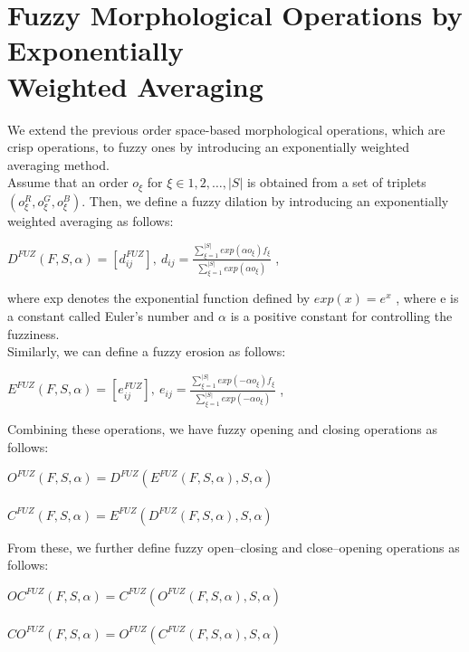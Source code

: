 \section*{Fuzzy Morphological Operations by Exponentially\\ Weighted Averaging}

We extend the previous order space-based morphological operations, which are crisp operations, to fuzzy ones by introducing an exponentially weighted averaging method.\\

Assume that an order $o_{\xi}$
 for $\xi\in{1,2,\ldots,|S|}$
 is obtained from a set of triplets $(o_{\xi}^{R}, o_{\xi}^{G}, o_{\xi}^{B})$. Then, we define a fuzzy dilation by introducing an exponentially weighted averaging  as follows:\\
\begin{center}
 $D^{FUZ}(F,S,\alpha) = [d_{ij}^{FUZ}], \  d_{ij}=\frac{\displaystyle\sum_{\xi=1}^{|S|} exp (\alpha o_{\xi})f_{\xi}}{\displaystyle\sum_{\xi=1}^{|S|} exp (\alpha o_{\xi})}$ , \\
 \end{center}
 
 where exp denotes the exponential function defined by $exp(x)=e^{x}$
, where e is a constant called Euler’s number and $\alpha$
 is a positive constant for controlling the fuzziness.\\

 Similarly, we can define a fuzzy erosion as follows:
 \begin{center}
 $E^{FUZ}(F,S,\alpha) = [e_{ij}^{FUZ}], \  e_{ij}=\frac{\displaystyle\sum_{\xi=1}^{|S|} exp (-\alpha o_{\xi})f_{\xi}}{\displaystyle\sum_{\xi=1}^{|S|} exp (-\alpha o_{\xi})}$ , \\
 \end{center}
Combining these operations, we have fuzzy opening and closing operations as follows:
\begin{center}
$O^{FUZ}(F,S,\alpha)=D^{FUZ}(E^{FUZ}(F,S,\alpha),S,\alpha)$
\\
\ 
\\
$C^{FUZ}(F,S,\alpha)=E^{FUZ}(D^{FUZ}(F,S,\alpha),S,\alpha)$
\end{center}
From these, we further define fuzzy open–closing and close–opening operations as follows:
\begin{center}
$OC^{FUZ}(F,S,\alpha)=C^{FUZ}(O^{FUZ}(F,S,\alpha),S,\alpha)$
\\
\ 
\\
$CO^{FUZ}(F,S,\alpha)=O^{FUZ}(C^{FUZ}(F,S,\alpha),S,\alpha)$
\end{center}

